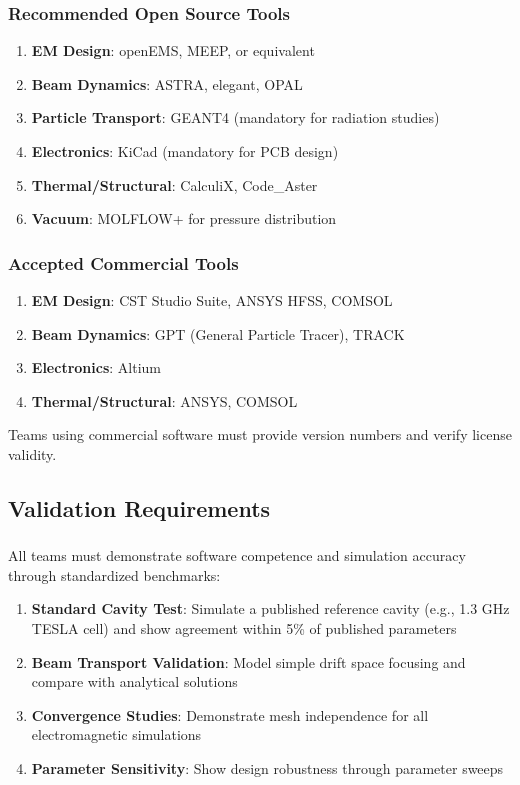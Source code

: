 \subsubsection{Recommended Open Source Tools}
\begin{enumerate}[noitemsep]
    \item \textbf{EM Design}: openEMS, MEEP, or equivalent
    \item \textbf{Beam Dynamics}: ASTRA, elegant, OPAL
    \item \textbf{Particle Transport}: GEANT4 (mandatory for radiation studies)
    \item \textbf{Electronics}: KiCad (mandatory for PCB design)
    \item \textbf{Thermal/Structural}: CalculiX, Code\_Aster
    \item \textbf{Vacuum}: MOLFLOW+ for pressure distribution
\end{enumerate}

\subsubsection{Accepted Commercial Tools}
\begin{enumerate}[noitemsep]
    \item \textbf{EM Design}: CST Studio Suite, ANSYS HFSS, COMSOL
    \item \textbf{Beam Dynamics}: GPT (General Particle Tracer), TRACK
    \item \textbf{Electronics}: Altium
    \item \textbf{Thermal/Structural}: ANSYS, COMSOL
\end{enumerate}

Teams using commercial software must provide version numbers and verify license validity.

\subsection{Validation Requirements}

\subsubsection{}
All teams must demonstrate software competence and simulation accuracy through standardized benchmarks:

\begin{enumerate}[noitemsep]
    \item \textbf{Standard Cavity Test}: Simulate a published reference cavity (e.g., 1.3 GHz TESLA cell) and show agreement within 5\% of published parameters
    \item \textbf{Beam Transport Validation}: Model simple drift space focusing and compare with analytical solutions
    \item \textbf{Convergence Studies}: Demonstrate mesh independence for all electromagnetic simulations
    \item \textbf{Parameter Sensitivity}: Show design robustness through parameter sweeps
\end{enumerate}

